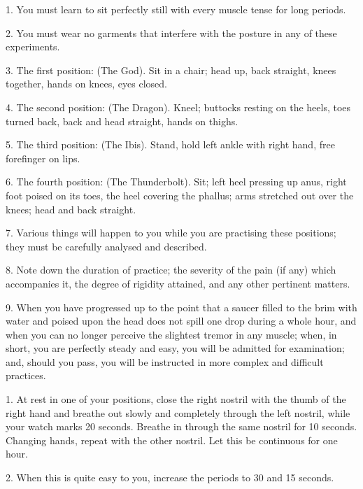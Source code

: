 

1. You must learn to sit perfectly still with every muscle tense for long periods.

2. You must wear no garments that interfere with the posture in any of these experiments.

3. The first position: (The God). Sit in a chair; head up, back straight, knees together, hands on knees, eyes closed.

4. The second position: (The Dragon). Kneel; buttocks resting on the heels, toes turned back, back and head straight, hands on thighs.

5. The third position: (The Ibis). Stand, hold left ankle with right hand, free forefinger on lips.

6. The fourth position: (The Thunderbolt). Sit; left heel pressing up anus, right foot poised on its toes, the heel covering the phallus; arms stretched out over the knees; head and back straight.

7. Various things will happen to you while you are practising these positions; they must be carefully analysed and described.

8. Note down the duration of practice; the severity of the pain (if any) which accompanies it, the degree of rigidity attained, and any other pertinent matters.

9. When you have progressed up to the point that a saucer filled to the brim with water and poised upon the head does not spill one drop during a whole hour, and when you can no longer perceive the slightest tremor in any muscle; when, in short, you are perfectly steady and easy, you will be admitted for examination; and, should you pass, you will be instructed in more complex and difficult practices.



1. At rest in one of your positions, close the right nostril with the thumb of the right hand and breathe out slowly and completely through the left nostril, while your watch marks 20 seconds. Breathe in through the same nostril for 10 seconds. Changing hands, repeat with the other nostril. Let this be continuous for one hour.

2. When this is quite easy to you, increase the periods to 30 and 15 seconds.

